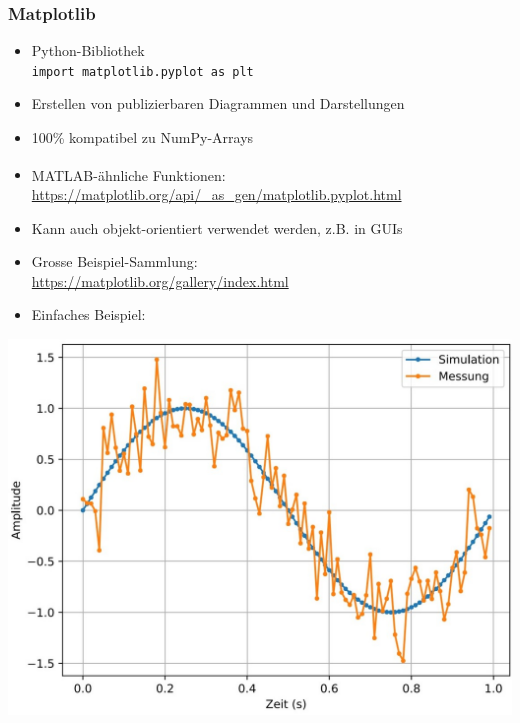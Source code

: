 \subsubsection{Matplotlib}
\begin{itemize}
	\item Python-Bibliothek\\
	\texttt{import matplotlib.pyplot as plt}
	\item Erstellen von publizierbaren Diagrammen und Darstellungen
	\item 100\% kompatibel zu NumPy-Arrays
	\item MATLAB\textsuperscript{\textregistered}-ähnliche Funktionen:\\
	\url{https://matplotlib.org/api/_as_gen/matplotlib.pyplot.html}
	\item Kann auch objekt-orientiert verwendet werden, z.B. in GUIs
	\item Grosse Beispiel-Sammlung:\\
	\url{https://matplotlib.org/gallery/index.html}
	\item Einfaches Beispiel:
\end{itemize}
\begin{multicols}{2}
	
	\vfill\null
	\columnbreak
	\includegraphics[width=\linewidth]{images/v8_numpy6}
\end{multicols}